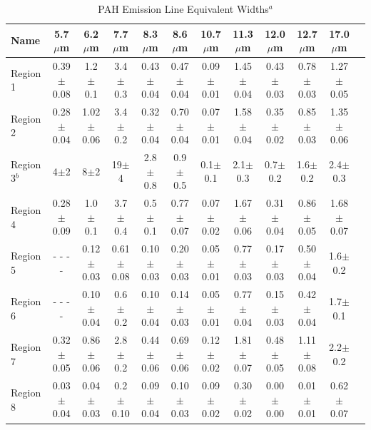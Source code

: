 \begin{table}
 \centering
 \begin{minipage}{200mm}
\caption{PAH Emission Line Equivalent Widths$^a$}
  \begin{tabular}{l c c  c  c  c  c  c  c  c  c c }
  \hline {Name  }&{5.7$\mu$m  }&{6.2$\mu$m  }&{7.7$\mu$m  }&{8.3$\mu$m  }&{8.6$\mu$m  }&{10.7$\mu$m  }&{11.3$\mu$m  }&{12.0$\mu$m  }&{12.7$\mu$m  }&{17.0$\mu$m  } 
   \\
 \hline
 Region 1 &0.39$\pm$0.08        & 1.2$\pm$0.1             & 3.4$\pm$0.3        & 0.43$\pm$0.04        & 0.47$\pm$0.04        & 0.09$\pm$0.01        & 1.45$\pm$0.04        & 0.43$\pm$0.03        & 0.78$\pm$0.03              & 1.27$\pm$0.05        \\
 Region 2 &0.28$\pm$0.04        & 1.02$\pm$0.06        & 3.4$\pm$0.2        & 0.32$\pm$0.04        & 0.70$\pm$0.04        & 0.07$\pm$0.01        & 1.58$\pm$0.04        & 0.35$\pm$0.02        & 0.85$\pm$0.03              & 1.35$\pm$0.06        \\
 Region 3$^b$ &4$\pm$2           & 8$\pm$2                   & 19$\pm$4            & 2.8$\pm$0.8             & 0.9$\pm$0.5             & 0.1$\pm$0.1            & 2.1$\pm$0.3             & 0.7$\pm$0.2            & 1.6$\pm$0.2                   & 2.4$\pm$0.3        \\
 Region 4 &0.28$\pm$0.09        & 1.0$\pm$0.1             & 3.7$\pm$0.4       & 0.5$\pm$0.1              & 0.77$\pm$0.07        & 0.07$\pm$0.02        & 1.67$\pm$0.06        & 0.31$\pm$0.04        & 0.86$\pm$0.05             & 1.68$\pm$0.07        \\
 Region 5 & - - - -        & 0.12$\pm$0.03        & 0.61$\pm$0.08   & 0.10$\pm$0.03        & 0.20$\pm$0.03        & 0.05$\pm$0.01        & 0.77$\pm$0.03        & 0.17$\pm$0.03        & 0.50$\pm$0.04            & 1.6$\pm$0.2        \\
 Region 6 & - - - -                          & 0.10$\pm$0.04        & 0.6$\pm$0.2        & 0.10$\pm$0.04        & 0.14$\pm$0.03        & 0.05$\pm$0.01        & 0.77$\pm$0.04        & 0.15$\pm$0.03        & 0.42$\pm$0.04            & 1.7$\pm$0.1        \\
 Region 7 &0.32$\pm$0.05        & 0.86$\pm$0.06        & 2.8$\pm$0.2        & 0.44$\pm$0.06        & 0.69$\pm$0.06        & 0.12$\pm$0.02        & 1.81$\pm$0.07        & 0.48$\pm$0.05        & 1.11$\pm$0.08            & 2.2$\pm$0.2        \\
 Region 8 &0.03$\pm$0.04        & 0.04$\pm$0.03        & 0.2$\pm$0.10      & 0.09$\pm$0.04        & 0.10$\pm$0.03        & 0.09$\pm$0.02        & 0.30$\pm$0.02        & 0.00$\pm$0.00        & 0.01$\pm$0.01            & 0.62$\pm$0.07        \\

\end{tabular}
\end{minipage}
\end{table}
